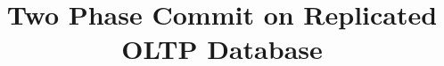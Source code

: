 \documentclass{vldb}
\begin{document}

\title{Two Phase Commit on Replicated OLTP Database}



%
%
%
%

\end{document}
